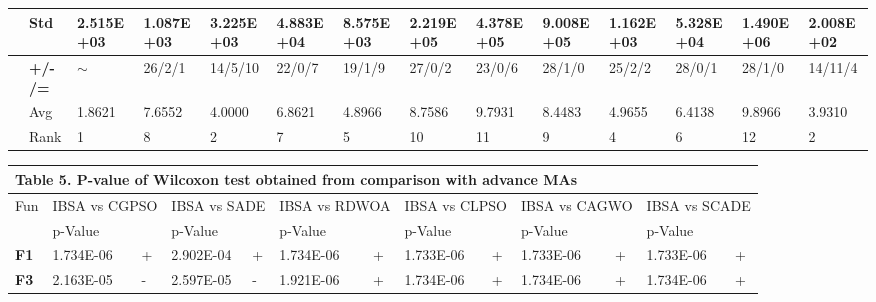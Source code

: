 \documentclass{article} %
\begin{document}
\begin{tabular}{|p{0.2in}|p{0.2in}|p{0.4in}|p{0.4in}|p{0.4in}|p{0.4in}|p{0.4in}|p{0.4in}|p{0.4in}|p{0.4in}|p{0.4in}|p{0.4in}|p{0.4in}|p{0.4in}|}
\textbf{} & Std & 2.515E+03 & 1.087E+03 & 3.225E+03 & 4.883E+04 & 8.575E+03 & 2.219E+05 & 4.378E+05 & 9.008E+05 & 1.162E+03 & 5.328E+04 & 1.490E+06 & \textbf{2.008E+02} \\ \hline 
\textbf{} & \textbf{+/-/=} & $\mathrm{\sim}$ & 26/2/1 & 14/5/10 & 22/0/7 & 19/1/9 & 27/0/2 & 23/0/6 & 28/1/0 & 25/2/2 & 28/0/1 & 28/1/0 & 14/11/4 \\ \hline 
\textbf{} & Avg & 1.8621  & 7.6552  & 4.0000  & 6.8621  & 4.8966  & 8.7586  & 9.7931  & 8.4483  & 4.9655  & 6.4138  & 9.8966  & 3.9310  \\ \hline 
\textbf{} & Rank & 1 & 8 & 2 & 7 & 5 & 10 & 11 & 9 & 4 & 6 & 12 & 2 \\ \hline 
\end{tabular}



\begin{tabular}{|p{0.3in}|p{0.2in}|p{0.3in}|p{0.2in}|p{0.1in}|p{0.3in}|p{0.3in}|p{0.2in}|p{0.6in}|p{0.1in}|p{0.2in}|p{0.3in}|p{0.3in}|p{0.1in}|p{0.1in}|p{0.4in}|p{0.2in}|p{0.1in}|p{0.1in}|p{0.5in}|p{0.2in}|p{0.2in}|} \hline 
\multicolumn{22}{|p{5.3in}|}{\textbf{Table }5\textbf{. }P-value of Wilcoxon test obtained from comparison with advance MAs} \\ \hline 
Fun & \multicolumn{4}{|p{0.8in}|}{IBSA vs CGPSO} & \multicolumn{3}{|p{0.8in}|}{IBSA vs SADE} & \multicolumn{3}{|p{1.0in}|}{IBSA vs RDWOA} & \multicolumn{4}{|p{0.9in}|}{IBSA vs CLPSO} & \multicolumn{4}{|p{0.8in}|}{IBSA vs CAGWO} & \multicolumn{3}{|p{0.9in}|}{IBSA vs SCADE} \\ \hline 
 & \multicolumn{2}{|p{0.6in}|}{p-Value} & \multicolumn{2}{|p{0.3in}|}{} & \multicolumn{2}{|p{0.6in}|}{p-Value} &  & \multicolumn{2}{|p{0.7in}|}{p-Value} &  & \multicolumn{2}{|p{0.6in}|}{p-Value} & \multicolumn{2}{|p{0.3in}|}{} & \multicolumn{2}{|p{0.6in}|}{p-Value} & \multicolumn{2}{|p{0.3in}|}{} & \multicolumn{2}{|p{0.6in}|}{p-Value} &  \\ \hline 
\textbf{F1} & \multicolumn{2}{|p{0.6in}|}{1.734E-06} & \multicolumn{2}{|p{0.3in}|}{+} & \multicolumn{2}{|p{0.6in}|}{2.902E-04} & + & \multicolumn{2}{|p{0.7in}|}{1.734E-06} & + & \multicolumn{2}{|p{0.6in}|}{1.733E-06} & \multicolumn{2}{|p{0.3in}|}{+} & \multicolumn{2}{|p{0.6in}|}{1.733E-06} & \multicolumn{2}{|p{0.3in}|}{+} & \multicolumn{2}{|p{0.6in}|}{1.733E-06} & + \\ \hline 
\textbf{F3} & \multicolumn{2}{|p{0.6in}|}{2.163E-05} & \multicolumn{2}{|p{0.3in}|}{-} & \multicolumn{2}{|p{0.6in}|}{2.597E-05} & - & \multicolumn{2}{|p{0.7in}|}{1.921E-06} & + & \multicolumn{2}{|p{0.6in}|}{1.734E-06} & \multicolumn{2}{|p{0.3in}|}{+} & \multicolumn{2}{|p{0.6in}|}{1.734E-06} & \multicolumn{2}{|p{0.3in}|}{+} & \multicolumn{2}{|p{0.6in}|}{1.734E-06} & + \\ \hline 

\end{tabular}
\end{document}
